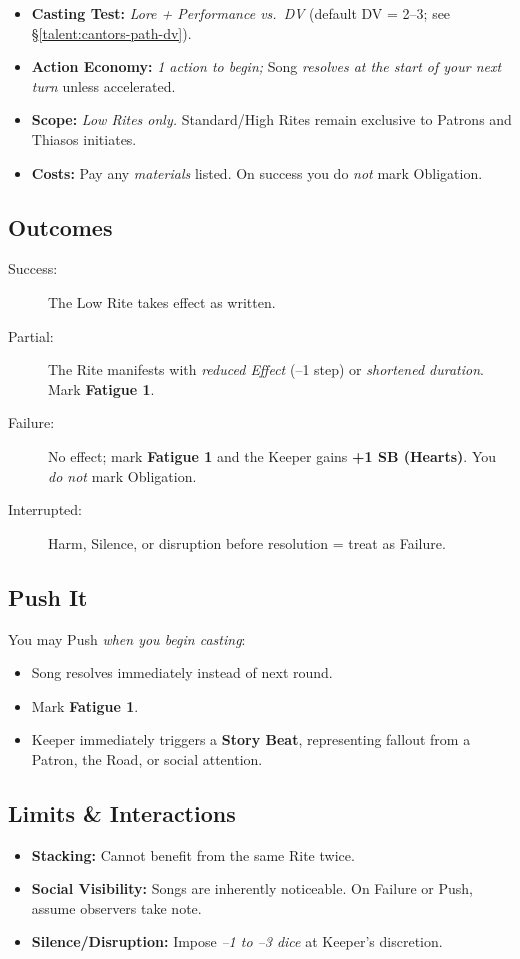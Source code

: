 \begin{itemize}
\item \textbf{Casting Test:} \emph{Lore + Performance vs.\ DV} (default DV = 2--3; see \S\ref{talent:cantors-path-dv}).
\item \textbf{Action Economy:} \emph{1 action to begin;} Song \emph{resolves at the start of your next turn} unless accelerated.
\item \textbf{Scope:} \emph{Low Rites only.} Standard/High Rites remain exclusive to Patrons and Thiasos initiates.
\item \textbf{Costs:} Pay any \emph{materials} listed. On success you do \emph{not} mark Obligation.
\end{itemize}

\subsection*{Outcomes}
\begin{description}
\item[Success:] The Low Rite takes effect as written.
\item[Partial:] The Rite manifests with \emph{reduced Effect} (–1 step) or \emph{shortened duration}. Mark \textbf{Fatigue 1}.
\item[Failure:] No effect; mark \textbf{Fatigue 1} and the Keeper gains \textbf{+1 SB (Hearts)}. You \emph{do not} mark Obligation.
\item[Interrupted:] Harm, Silence, or disruption before resolution = treat as Failure.
\end{description}

\subsection*{Push It}
You may Push \emph{when you begin casting}:
\begin{itemize}
\item Song resolves immediately instead of next round.
\item Mark \textbf{Fatigue 1}.
\item Keeper immediately triggers a \textbf{Story Beat}, representing fallout from a Patron, the Road, or social attention.
\end{itemize}

\subsection*{Limits \& Interactions}
\begin{itemize}
\item \textbf{Stacking:} Cannot benefit from the same Rite twice.
\item \textbf{Social Visibility:} Songs are inherently noticeable. On Failure or Push, assume observers take note.
\item \textbf{Silence/Disruption:} Impose \emph{–1 to –3 dice} at Keeper’s discretion.
\end{itemize}

